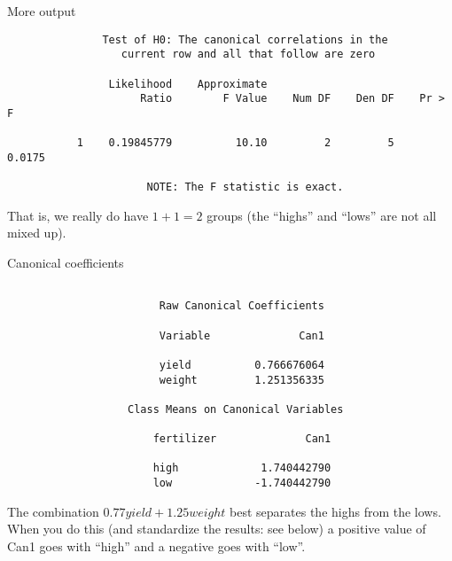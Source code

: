 \documentclass[pdf]{prosper}
\begin{document}
\begin{slide}{More output}

{\scriptsize
\begin{verbatim}
               Test of H0: The canonical correlations in the
                  current row and all that follow are zero
 
                Likelihood    Approximate
                     Ratio        F Value    Num DF    Den DF    Pr > F

           1    0.19845779          10.10         2         5    0.0175

                      NOTE: The F statistic is exact.
\end{verbatim}
}

That is, we really do have $1+1=2$ groups (the ``highs'' and ``lows'' are not all mixed up). 

\end{slide}
\begin{slide}{Canonical coefficients}

{\scriptsize
\begin{verbatim}

                        Raw Canonical Coefficients
 
                        Variable              Can1

                        yield          0.766676064
                        weight         1.251356335

                   Class Means on Canonical Variables
 
                       fertilizer              Can1

                       high             1.740442790
                       low             -1.740442790
\end{verbatim}
}

The combination $0.77 yield + 1.25 weight$ best separates the highs from the lows. When you do this (and standardize the results: see below) a positive value of Can1 goes with ``high'' and a negative goes with ``low''.

\end{slide}
\end{document}
